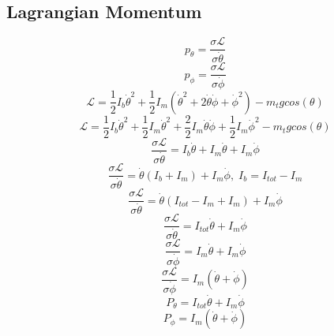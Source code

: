 \documentclass[12pt]{article}
\begin{document}
		\subsection{Lagrangian Momentum}
			\begin{equation}
				p_{\theta} = \frac{\sigma\mathcal{L}}{\sigma \dot\theta}
			\end{equation}
			\begin{equation}
				p_{\phi} = \frac{\sigma\mathcal{L}}{\sigma \dot\phi}
			\end{equation}
			\begin{equation}
				\mathcal{L} = \frac{1}{2}I_b\dot\theta^2  +  \frac{1}{2}I_m(\dot\theta^2 + 2\dot\theta\dot\phi + \dot\phi^2) - m_{t}gcos(\theta)
			\end{equation}
			\begin{equation}
				\mathcal{L} = \frac{1}{2}I_b\dot\theta^2  +  \frac{1}{2}I_m\dot\theta^2 + \frac{2}{2}I_m\dot\theta\dot\phi + \frac{1}{2}I_m\dot\phi^2 - m_{t}gcos(\theta)
			\end{equation}
			\begin{equation}
				\frac{\sigma\mathcal{L}}{\sigma \dot\theta} = I_b\dot\theta + I_m\dot\theta + I_m\dot\phi
			\end{equation}
			\begin{equation}
				\frac{\sigma\mathcal{L}}{\sigma \dot\theta} = \dot\theta(I_b + I_m) + I_m\dot\phi, \; I_b = I_{tot} - I_m
			\end{equation}
			\begin{equation}
				\frac{\sigma\mathcal{L}}{\sigma \dot\theta} = \dot\theta(I_{tot} - I_m + I_m) + I_m\dot\phi
			\end{equation}
			\begin{equation}
				\frac{\sigma\mathcal{L}}{\sigma \dot\theta} = I_{tot}\dot\theta + I_m\dot\phi
			\end{equation}
			\begin{equation}
				\frac{\sigma\mathcal{L}}{\sigma \dot\phi} = I_m\dot\theta + I_m\dot\phi
			\end{equation}
			\begin{equation}
				\frac{\sigma\mathcal{L}}{\sigma \dot\phi} = I_m(\dot\theta + \dot\phi)
			\end{equation}
			\begin{equation}
				\boxed{P_\theta = I_{tot}\dot\theta + I_m\dot\phi}
			\end{equation}
			\begin{equation}
				\boxed{P_\phi = I_m(\dot\theta + \dot\phi)}
			\end{equation}
\end{document}
